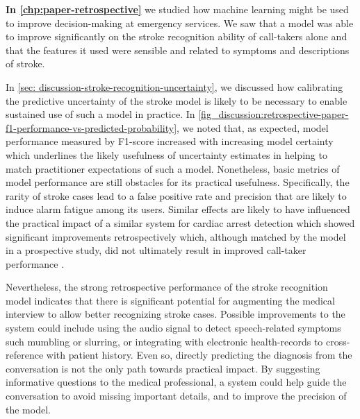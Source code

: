\vspace{1em}
\textbf{In \cref{chp:paper-retrospective}} we studied how machine learning might be used to improve decision-making at emergency services. 
We saw that a model was able to improve significantly on the stroke recognition ability of call-takers alone and that the features it used were sensible and related to symptoms and descriptions of stroke. 

In \cref{sec: discussion-stroke-recognition-uncertainty}, we discussed how calibrating the predictive uncertainty of the stroke model is likely to be necessary to enable sustained use of such a model in practice. In \cref{fig_discussion:retrospective-paper-f1-performance-vs-predicted-probability}, we noted that, as expected, model performance measured by F1-score increased with increasing model certainty which underlines the likely usefulness of uncertainty estimates in helping to match practitioner expectations of such a model. Nonetheless, basic metrics of model performance are still obstacles for its practical usefulness. Specifically, the rarity of stroke cases lead to a false positive rate and precision that are likely to induce alarm fatigue among its users. Similar effects are likely to have influenced the practical impact of a similar system for cardiac arrest detection which showed significant improvements retrospectively \parencite{cite14} which, although matched by the model in a prospective study, did not ultimately result in improved call-taker performance \parencite{cite15}. 

Nevertheless, the strong retrospective performance of the stroke recognition model indicates that there is significant potential for augmenting the medical interview to allow better recognizing stroke cases. 
Possible improvements to the system could include using the audio signal to detect speech-related symptoms such mumbling or slurring, or integrating with electronic health-records to cross-reference with patient history. 
Even so, directly predicting the diagnosis from the conversation is not the only path towards practical impact. By suggesting informative questions to the medical professional, a system could help guide the conversation to avoid missing important details, and to improve the precision of the model. 





